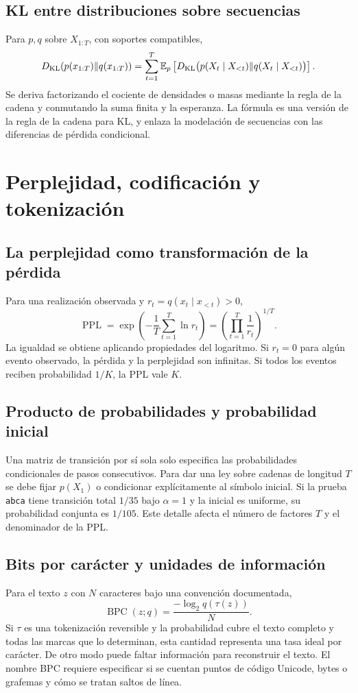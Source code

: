 \section{KL entre distribuciones sobre secuencias}
Para $p,q$ sobre $X_{1:T}$, con soportes compatibles,
\[
D_{\rm KL}(p(x_{1:T})\|q(x_{1:T}))=
\sum_{t=1}^T\mathbb E_p\left[
D_{\rm KL}\bigl(p(X_t\mid X_{<t})\|q(X_t\mid X_{<t})\bigr)\right].
\]
Se deriva factorizando el cociente de densidades o masas mediante la regla
de la cadena y conmutando la suma finita y la esperanza. La fórmula es una
versión de la regla de la cadena para KL, y enlaza la modelación de
secuencias con las diferencias de pérdida condicional.

\chapter{Perplejidad, codificación y tokenización}
\section{La perplejidad como transformación de la pérdida}
Para una realización observada y $r_t=q(x_t\mid x_{<t})>0$,
\[
\operatorname{PPL}=\exp\left(-\frac1T\sum_{t=1}^T\ln r_t\right)
=\left(\prod_{t=1}^T\frac1{r_t}\right)^{1/T}.
\]
La igualdad se obtiene aplicando propiedades del logaritmo. Si $r_t=0$
para algún evento observado, la pérdida y la perplejidad son infinitas.
Si todos los eventos reciben probabilidad $1/K$, la PPL vale $K$.
\section{Producto de probabilidades y probabilidad inicial}
Una matriz de transición por sí sola solo especifica las probabilidades
condicionales de pasos consecutivos. Para dar una ley sobre cadenas de
longitud $T$ se debe fijar $p(X_1)$ o condicionar explícitamente al símbolo
inicial. Si la prueba \texttt{abca} tiene transición total $1/35$ bajo
$\alpha=1$ y la inicial es uniforme, su probabilidad conjunta es $1/105$.
Este detalle afecta el número de factores $T$ y el denominador de la PPL.
\section{Bits por carácter y unidades de información}
Para el texto $z$ con $N$ caracteres bajo una convención documentada,
\[
\operatorname{BPC}(z;q)=\frac{-\log_2q(\tau(z))}{N}.
\]
Si $\tau$ es una tokenización reversible y la probabilidad cubre el texto
completo y todas las marcas que lo determinan, esta cantidad representa
una tasa ideal por carácter. De otro modo puede faltar información para
reconstruir el texto. El nombre BPC requiere especificar si se cuentan
puntos de código Unicode, bytes o grafemas y cómo se tratan saltos de línea.
